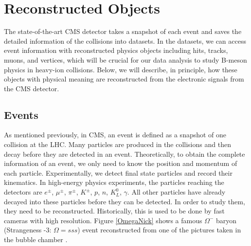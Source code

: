 \chapter{Reconstructed Objects}

The state-of-the-art CMS detector takes a snapshot of each event and saves the detailed information of the collisions into datasets. In the datasets, we can access event information with reconstructed physics objects including hits, tracks, muons, and vertices, which will be crucial for our data analysis to study B-meson physics in heavy-ion collisions. Below, we will describe, in principle, how these objects with physical meaning are reconstructed from the electronic signals from the CMS detector.

\section{Events}

As mentioned previously, in CMS, an event is defined as a snapshot of one collision at the LHC. Many particles are produced in the collisions and then decay before they are detected in an event. Theoretically, to obtain the complete information of an event, we only need to know the position and momentum of each particle. Experimentally, we detect final state particles and record their kinematics. In high-energy physics experiments, the particles reaching the detectors are $e^{\pm}$, $\mu^{\pm}$, $\pi^{\pm}$, $K^{\pm}$, $p$, $n$, $K^0_L$, $\gamma$. All other particles have already decayed into these particles before they can be detected. In order to study them, they need to be reconstructed. Historically, this is used to be done by fast cameras with high resolution. Figure \ref{OmegaNick} shows a famous $\Omega^-$ baryon (Strangeness -3: $\Omega = sss$) event reconstructed from one of the pictures taken in the bubble chamber \cite{OmegaRef}.

